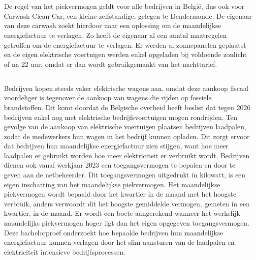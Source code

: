 
\chapter{}%
\label{ch:inleiding}

De regel van het piekvermogen geldt voor alle bedrijven in België, dus ook voor Carwash Clean Car, een kleine zelfstandige, gelegen te Dendermonde. De eigenaar van deze carwash zoekt hierdoor naar een oplossing om de maandelijkse energiefactuur te verlagen. Zo heeft de eigenaar al een aantal maatregelen getroffen om de energiefactuur te verlagen. Er werden al zonnepanelen geplaatst en de eigen elektrische voertuigen werden enkel opgeladen bij voldoende zonlicht of na 22 uur, omdat er dan wordt gebruikgemaakt van het nachttarief.

\pagebreak

\section{}%
\label{sec:probleemstelling}

Bedrijven kopen steeds vaker elektrische wagens aan, omdat deze aankoop fiscaal voordeliger is tegenover de aankoop van wagens die rijden op fossiele brandstoffen. Dit komt doordat de Belgische overheid heeft beslist dat tegen 2026 bedrijven enkel nog met elektrische bedrijfsvoertuigen mogen rondrijden. Ten gevolge van de aankoop van elektrische voertuigen plaatsen bedrijven laadpalen, zodat de medewerkers hun wagen in het bedrijf kunnen opladen. Dit zorgt ervoor dat bedrijven hun maandelijkse energiefactuur zien stijgen, want hoe meer laadpalen er gebruikt worden hoe meer elektriciteit er verbruikt wordt. Bedrijven dienen ook vanaf werkjaar 2023 een toegangsvermogen te bepalen en door te geven aan de netbeheerder. Dit toegangsvermogen uitgedrukt in kilowatt, is een eigen inschatting van het maandelijkse piekvermogen. Het maandelijkse piekvermogen wordt bepaald door het kwartier in de maand met het hoogste verbruik, anders verwoordt dit het hoogste gemiddelde vermogen, gemeten in een kwartier, in de maand. Er wordt een boete aangerekend wanneer het werkelijk maandelijks piekvermogen hoger ligt dan het eigen opgegeven toegangsvermogen. Deze bachelorproef onderzoekt hoe bepaalde bedrijven hun maandelijkse energiefactuur kunnen verlagen door het slim aansturen van de laadpalen en elektriciteit intensieve bedrijfsprocessen.

